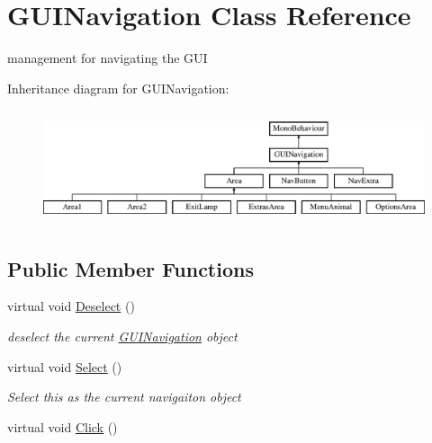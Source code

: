 \hypertarget{class_g_u_i_navigation}{}\section{G\+U\+I\+Navigation Class Reference}
\label{class_g_u_i_navigation}


management for navigating the G\+UI  


Inheritance diagram for G\+U\+I\+Navigation\+:\begin{figure}[H]
\begin{center}
\leavevmode
\includegraphics[height=3.393939cm]{class_g_u_i_navigation}
\end{center}
\end{figure}
\subsection*{Public Member Functions}
\begin{DoxyCompactItemize}
\item 
virtual void \mbox{\hyperlink{class_g_u_i_navigation_a98563f06446b45814ff78978b472e948}{Deselect}} ()
\begin{DoxyCompactList}\small\item\em deselect the current \mbox{\hyperlink{class_g_u_i_navigation}{G\+U\+I\+Navigation}} object \end{DoxyCompactList}\item 
virtual void \mbox{\hyperlink{class_g_u_i_navigation_a4c40fc7986ac35247bc8f77c615e7847}{Select}} ()
\begin{DoxyCompactList}\small\item\em Select this as the current navigaiton object \end{DoxyCompactList}\item 
virtual void \mbox{\hyperlink{class_g_u_i_navigation_a175178a8bf2832e74c13f83bf8e8f714}{Click}} ()
\end{DoxyCompactItemize}
